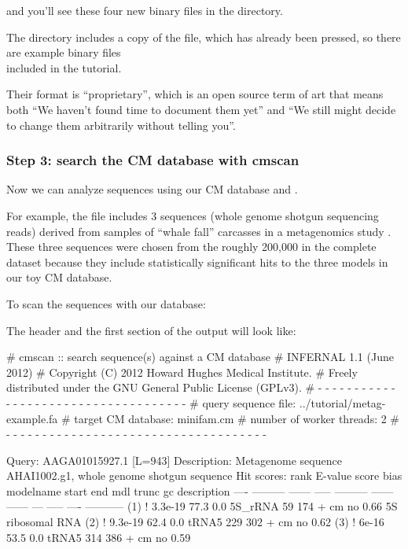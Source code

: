 and you'll see these four new binary files in the directory. 

The  directory includes a copy of the
 file, which has already been pressed, so there
are example binary files\\
included in the tutorial.

Their format is ``proprietary'', which is an open source term of art
that means both ``We haven't found time to document them yet'' and ``We
still might decide to change them arbitrarily without telling you''.

\subsubsection{Step 3: search the CM database with cmscan}

Now we can analyze sequences using our CM database and
. 

For example, the file  includes 3
sequences (whole genome shotgun sequencing reads) derived from samples
of ``whale fall'' carcasses in a metagenomics study
\cite{Tringe05}. These three sequences were chosen from the roughly
200,000 in the complete dataset because they include statistically
significant hits to the three models in our toy CM database.

To scan the sequences with our database: 


The header and the first section of the output will look like:

\begin{sreoutput}
# cmscan :: search sequence(s) against a CM database
# INFERNAL 1.1 (June 2012)
# Copyright (C) 2012 Howard Hughes Medical Institute.
# Freely distributed under the GNU General Public License (GPLv3).
# - - - - - - - - - - - - - - - - - - - - - - - - - - - - - - - - - - - -
# query sequence file:                   ../tutorial/metag-example.fa
# target CM database:                    minifam.cm
# number of worker threads:              2
# - - - - - - - - - - - - - - - - - - - - - - - - - - - - - - - - - - - -

Query:       AAGA01015927.1  [L=943]
Description: Metagenome sequence AHAI1002.g1, whole genome shotgun sequence
Hit scores:
 rank     E-value  score  bias  modelname  start    end   mdl trunc   gc  description
 ----   --------- ------ -----  --------- ------ ------   --- ----- ----  -----------
  (1) !   3.3e-19   77.3   0.0  5S_rRNA       59    174 +  cm    no 0.66  5S ribosomal RNA
  (2) !   9.3e-19   62.4   0.0  tRNA5        229    302 +  cm    no 0.62  
  (3) !     6e-16   53.5   0.0  tRNA5        314    386 +  cm    no 0.59  
\end{sreoutput}

